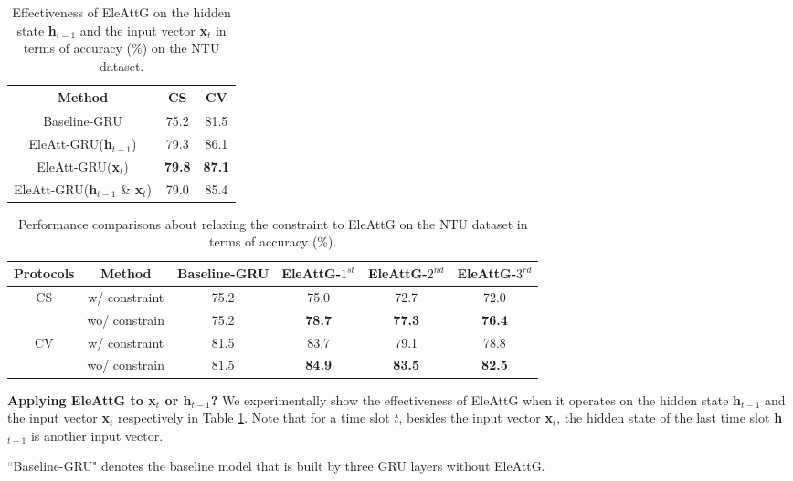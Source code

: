 \documentclass[journal]{IEEEtran}
\begin{document}
\begin{table}[!]
  \centering
  \caption{Effectiveness of EleAttG on the hidden state \textbf{h$_{t-1}$} and the input vector \textbf{x$_t$} in terms of accuracy (\%) on the NTU dataset.}
    \begin{tabular}{ccc}
    \toprule
    Method & CS    & CV \\
    \midrule
    Baseline-GRU & 75.2  & 81.5 \\
    EleAtt-GRU(\textbf{h$_{t-1}$}) & 79.3  & 86.1 \\
    EleAtt-GRU(\textbf{x$_t$}) & \textbf{79.8}  & \textbf{87.1} \\
    EleAtt-GRU(\textbf{h$_{t-1}$} \& \textbf{x$_t$}) & 79.0    & 85.4 \\
    \bottomrule
    \end{tabular}
  \label{tab:EleAttG}
\end{table}

\setlength{\tabcolsep}{4pt}
\begin{table*}[th]
	\centering
	\caption{Performance comparisons about relaxing the constraint to EleAttG on the NTU dataset in terms of accuracy (\%).}
	\label{tab:constrain}
	\begin{tabular}{cccccc}
		\toprule
		Protocols           & Method              & Baseline-GRU & EleAttG-$1^{st}$ & EleAttG-$2^{nd}$ & EleAttG-$3^{rd}$ \\
		\midrule
		\multirow{2}{*}{CS} &  w/ constraint  & 75.2          & 75.0      & 72.7      & 72.0      \\
		&  wo/ constrain & 75.2          & \bf{78.7}      & \bf{77.3}      & \bf{76.4}      \\
		\midrule
		\multirow{2}{*}{CV} &  w/ constraint  & 81.5          & 83.7      & 79.1      & 78.8      \\
		&  wo/ constrain & 81.5          & \bf{84.9}      & \bf{83.5}      & \bf{82.5}     \\
		\bottomrule
	\end{tabular}
\end{table*}
\textbf{Applying EleAttG to x$_t$ or h$_{t-1}$?} We experimentally show the effectiveness of EleAttG when it operates on the hidden state \textbf{h$_{t-1}$} and the input vector \textbf{x$_t$} respectively in Table \ref{tab:EleAttG}. Note that for a time slot $t$, besides the input vector \textbf{x$_t$}, the hidden state of the last time slot \textbf{h$_{t-1}$} is another input vector.

``Baseline-GRU" denotes the baseline model that is built by three GRU layers without EleAttG. 
\end{document}

